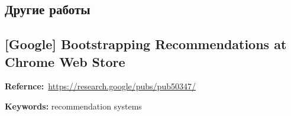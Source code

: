 \begin{bibunit}[plainnat]





\chapter{Другие работы}

\section*{[Google] Bootstrapping Recommendations at Chrome Web Store}

\textbf{Refernce:}~\url{https://research.google/pubs/pub50347/}

\textbf{Keywords:} recommendation systems \\



\putbib[refs_ir]
\end{bibunit}
